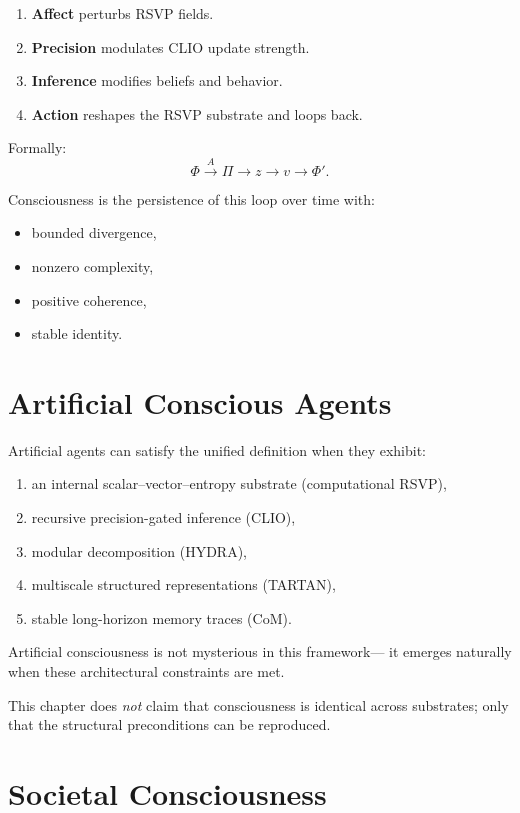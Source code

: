 \documentclass[12pt,oneside]{book}
\theoremstyle{plain}
\theoremstyle{definition}
\def\mathbf#1{#1}%
\begin{document}
\begin{enumerate}
    \item \textbf{Affect} perturbs RSVP fields.
    \item \textbf{Precision} modulates CLIO update strength.
    \item \textbf{Inference} modifies beliefs and behavior.
    \item \textbf{Action} reshapes the RSVP substrate and loops back.
\end{enumerate}

Formally:
\[
\Phi \xrightarrow{A} \Pi \xrightarrow{} z \xrightarrow{} \mathbf{v} \xrightarrow{} \Phi'.
\]

Consciousness is the persistence of this loop over time with:

\begin{itemize}
    \item bounded divergence,
    \item nonzero complexity,
    \item positive coherence,
    \item stable identity.
\end{itemize}

\section{Artificial Conscious Agents}

Artificial agents can satisfy the unified definition when they exhibit:

\begin{enumerate}
    \item an internal scalar–vector–entropy substrate (computational RSVP),
    \item recursive precision-gated inference (CLIO),
    \item modular decomposition (HYDRA),
    \item multiscale structured representations (TARTAN),
    \item stable long-horizon memory traces (CoM).
\end{enumerate}

Artificial consciousness is not mysterious in this framework—  
it emerges naturally when these architectural constraints are met.

This chapter does \emph{not} claim that consciousness is identical across 
substrates;  
only that the structural preconditions can be reproduced.

\section{Societal Consciousness}
\end{document}

